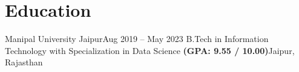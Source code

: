 \section{Education}
    \resumeSubHeadingListStart

    \resumeSubheading
    {Manipal University Jaipur}{Aug 2019 -- May 2023}
    {B.Tech in Information Technology with Specialization in Data Science \textbf{(GPA: 9.55 / 10.00)}}{Jaipur, Rajasthan}
    \resumeItemListStart
    \resumeItemListEnd
    \resumeSubHeadingListEnd